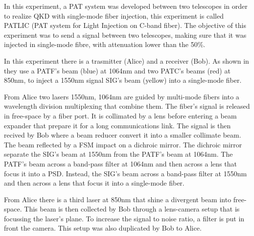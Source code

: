 In this experiment, a PAT system was developed between two telescopes in order to realize QKD with single-mode fiber injection, this experiment is called PATLIC (PAT system for Light Injection on C-band fiber).
The objective of this experiment was to send a signal between two telescopes, making sure that it was injected in single-mode fibre, with attenuation lower than the 50\%.

In this experiment there is a trasmitter (Alice) and a receiver (Bob). As shown in  they use a PATF's beam (blue) at 1064nm and two PATC's beams (red) at 850nm, to inject a 1550nm signal SIG's beam (yellow) into a single-mode fiber.

From Alice two lasers 1550nm, 1064nm are guided by multi-mode fibers into a wavelength division multiplexing that combine them. The fiber's signal is released in free-space by a fiber port. It is collimated by a lens before entering a beam expander that prepare it for a long communications link. The signal is then recived by Bob where a beam reducer convert it into a smaller collimate beam. The beam reflected by a FSM impact on a dichroic mirror. The dichroic mirror separate the SIG's beam at 1550nm from the PATF's beam at 1064nm. The PATF's beam across a band-pass filter at 1064nm and then across a lens that focus it into a PSD. Instead, the SIG's beam across a band-pass filter at 1550nm and then across a lens that focus it into a single-mode fiber.

From Alice there is a third laser at 850nm that shine a divergent beam into free-space. This beam is then collected by Bob through a lens-camera setup that is focussing the laser's plane. To increase the signal to noise ratio, a filter is put in front the camera. This setup was also duplicated by Bob to Alice.

